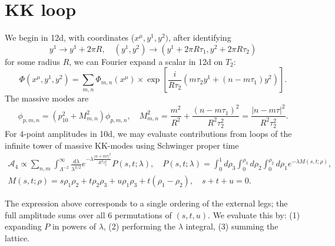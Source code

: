 \section{KK loop}
We begin in 12d, with coordinates ($x^\mu,y^1,y^2)$, after identifying
\begin{equation}
y^1\to y^1+2\pi R,\quad
(y^1,y^2)\to (y^1+2\pi R\tau_1,y^2+2\pi R\tau_2)
\end{equation}
for some radius $R$, we can Fourier expand a scalar in 12d on $T_2$:
\begin{equation}
\Phi(x^\mu,y^1,y^2)
=\sum_{m,n}\Phi_{m,n}(x^\mu) \times\exp
\left[
\frac{i}{R\tau_2}\left(m\tau_2y^1 + (n-m\tau_1)y^2\right)
\right].
\end{equation}
The massive modes are
\begin{equation}
[-\nabla^2_{10}-\nabla^2_2]\phi_{p,m,n}
=\left(p_{10}^2+M_{m,n}^2\right)\phi_{p,m,n},\quad
M^2_{m,n} 
= \frac{m^2}{R^2}+\frac{(n-m\tau_1)^2}{R^2\tau_2^2}
=\frac{|n-m\tau|^2}{R^2\tau_2^2}.
\end{equation}
For 4-point amplitudes in 10d, we may evaluate contributions from loops of the infinite tower of massive KK-modes using Schwinger proper time
\cite{Green:1997as,Beccaria:2023hhi}
\begin{equation}
\begin{aligned}
\mathcal{A}_4
\propto \sum_{n,m}\int_{\Lambda^{-2}}^\infty
\frac{d\lambda}{\lambda^{3/2}}
e^{-\lambda \frac{|n+m\tau|^2}{R^2\tau_2^2}}
P(s,t;\lambda),\quad
P(s,t;\lambda)
=\int_0^1d\rho_3 \int_0^{\rho_3}d\rho_2\int_0^{\rho_2} d\rho_1e^{-\lambda M(s,t;\rho)},\\
M(s,t;\rho)=s\rho_1\rho_2+t\rho_2\rho_3+u\rho_1\rho_3 + t(\rho_1-\rho_2),\quad
s+t+u=0.
\end{aligned}
\end{equation}

The expression above corresponds to a single ordering of the external legs; the full amplitude sums over all 6 permutations of $(s,t,u)$.
We evaluate this by: (1) expanding $P$ in powers of $\lambda$, (2) performing the $\lambda$ integral, (3) summing the lattice.

